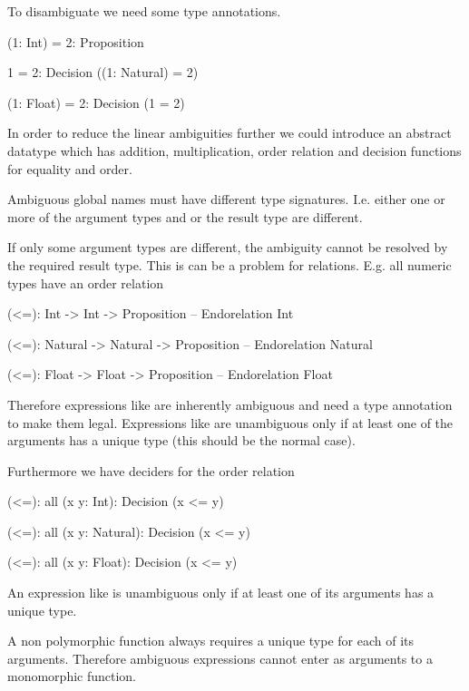 To disambiguate we need some type annotations.

\begin{alba}
    (1: Int) = 2: Proposition

    1 = 2: Decision ((1: Natural) = 2)

    (1: Float) = 2: Decision (1 = 2)
\end{alba}


In order to reduce the linear ambiguities further we could introduce an abstract
datatype  which has addition, multiplication, order relation and
decision functions for equality and order.


Ambiguous global names must have different type signatures. I.e. either one or
more of the argument types and or the result type are different.

If only some argument types are different, the ambiguity cannot be resolved by
the required result type. This is can be a problem for relations. E.g. all
numeric types have an order relation

\begin{alba}
    (<=): Int -> Int -> Proposition             -- Endorelation Int

    (<=): Natural -> Natural -> Proposition     -- Endorelation Natural

    (<=): Float -> Float -> Proposition         -- Endorelation Float
\end{alba}

Therefore expressions like  are inherently ambiguous and need a
type annotation to make them legal. Expressions like  are
unambiguous only if at least one of the arguments has a unique type (this should
be the normal case).

Furthermore we have deciders for the order relation

\begin{alba}
    (<=): all (x y: Int): Decision (x <= y)

    (<=): all (x y: Natural): Decision (x <= y)

    (<=): all (x y: Float): Decision (x <= y)
\end{alba}

An expression like  is unambiguous only if at least one
of its arguments has a unique type.

A non polymorphic function always requires a unique type for each of its
arguments. Therefore ambiguous expressions cannot enter as arguments to a
monomorphic function.

